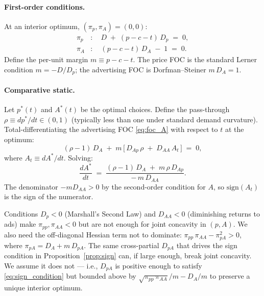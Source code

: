 \paragraph{First-order conditions.} At an interior
optimum, $(\pi_p, \pi_A) = (0, 0)$:
\begin{align}
    \pi_p &: \quad D \;+\; (p - c - t)\, D_p \;=\; 0,
        \label{eq:foc_p} \\
    \pi_A &: \quad (p - c - t)\, D_A \;-\; 1 \;=\; 0.
        \label{eq:foc_A}
\end{align}
Define the per-unit margin $m \equiv p - c - t$. The
price FOC is the standard Lerner condition
$m = -D / D_p$; the advertising FOC is Dorfman--Steiner
$m \, D_A = 1$.

\paragraph{Comparative static.} Let $p^*(t)$ and $A^*(t)$
be the optimal choices. Define the pass-through
$\rho \equiv dp^*/dt \in (0, 1)$ (typically less than one
under standard demand curvature). Total-differentiating
the advertising FOC \eqref{eq:foc_A} with respect to $t$
at the optimum:
\begin{equation}\label{eq:dAdt_unsolved}
    (\rho - 1)\, D_A
    \;+\; m \,\bigl[\, D_{Ap}\, \rho \;+\; D_{AA}\, A_t \,\bigr]
    \;=\; 0,
\end{equation}
where $A_t \equiv dA^*/dt$. Solving:
\begin{equation}\label{eq:dAdt}
    \boxed{\quad
    \frac{dA^*}{dt}
    \;=\;
    \frac{(\rho - 1)\, D_A \;+\; m \, \rho \, D_{Ap}}
         {-\, m \, D_{AA}}.
    \quad}
\end{equation}
The denominator $-m D_{AA} > 0$ by the second-order
condition for $A$, so $\mathrm{sign}(A_t)$ is the sign
of the numerator.

\begin{remark}
\label{rem:uniqueness}
Conditions $D_p < 0$ (Marshall's Second Law) and
$D_{AA} < 0$ (diminishing returns to ads) make
$\pi_{pp}, \pi_{AA} < 0$ but are not enough for joint
concavity in $(p, A)$. We also need the off-diagonal
Hessian term not to dominate:
$\pi_{pp}\, \pi_{AA} - \pi_{pA}^2 > 0$, where
$\pi_{pA} = D_A + m\, D_{pA}$. The same cross-partial
$D_{pA}$ that drives the sign condition in
Proposition~\ref{prop:sign} can, if large enough,
break joint concavity. We assume it does not — i.e.,
$D_{pA}$ is positive enough to satisfy
\eqref{eq:sign_condition} but bounded above by
$\sqrt{\pi_{pp}\, \pi_{AA}}/m - D_A/m$ to preserve a
unique interior optimum.
\end{remark}

